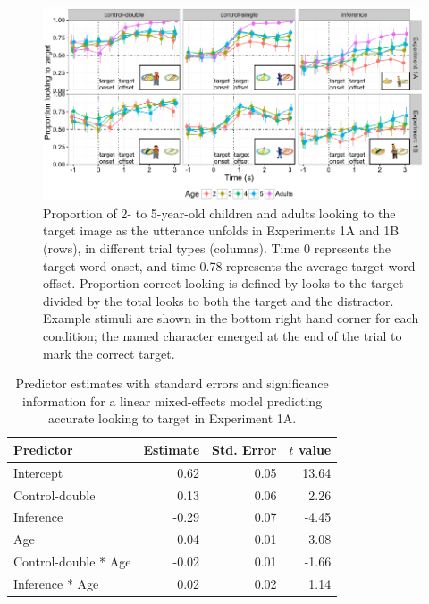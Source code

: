 \documentclass[a4paper,man,apacite,floatsintext]{apa6}
\newenvironment{CodeChunk}{}{}
\begin{document}
\begin{CodeChunk}
\begin{figure}[H]

{\centering \includegraphics{figs/et_accuracy-1} 

}

\caption[Proportion of 2- to 5-year-old children and adults looking to the target image as the utterance unfolds in Experiments 1A and 1B (rows), in different trial types (columns)]{Proportion of 2- to 5-year-old children and adults looking to the target image as the utterance unfolds in Experiments 1A and 1B (rows), in different trial types (columns). Time 0 represents the target word onset, and time 0.78 represents the average target word offset. Proportion correct looking is defined by looks to the target divided by the total looks to both the target and the distractor. Example stimuli are shown in the bottom right hand corner for each condition; the named character emerged at the end of the trial to mark the correct target.}\label{fig:et_accuracy}
\end{figure}
\end{CodeChunk}

\begin{table}[tb]
\centering
\begin{tabular}{lrrr}
 Predictor & Estimate & Std. Error & $t$ value \\ 
  \hline
Intercept & 0.62 & 0.05 & 13.64 \\ 
  Control-double & 0.13 & 0.06 & 2.26 \\ 
  Inference & -0.29 & 0.07 & -4.45 \\ 
  Age & 0.04 & 0.01 & 3.08 \\ 
  Control-double * Age & -0.02 & 0.01 & -1.66 \\ 
  Inference * Age & 0.02 & 0.02 & 1.14 \\ 
   \hline
\end{tabular}
\caption{Predictor estimates with standard errors and significance information for a linear mixed-effects model predicting accurate looking to target in Experiment 1A.} 
\label{tab:exp1_tab}
\end{table}
\end{document}
